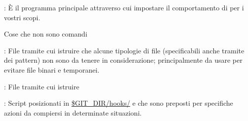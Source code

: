 \elemento{}: \`E il programma principale attraverso cui impostare il
comportamento di  per i vostri scopi.

\sezione Cose che non sono comandi

\elemento{}: File tramite cui istruire  che alcune
tipologie di file (specificabili anche tramite dei pattern) non sono da tenere
in considerazione; principalmente da usare per evitare file binari e
temporanei.

\elemento{}: File tramite cui istruire 

\elemento{}: Script posizionati in \url{$GIT_DIR/hooks/} e che sono
preposti per specifiche azioni da compiersi in determinate situazioni.

